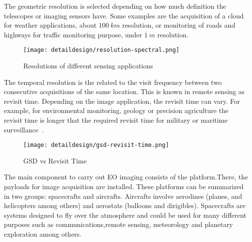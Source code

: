 

The geometric resolution is selected depending on how much definition the
telescopes or imaging sensors have. Some examples are the acquisition of a cloud
for weather applications, about $100~km$ resolution, or monitoring of roads and
highways for traffic monitoring purpose, under $1~m$ resolution.

\begin{figure}[!h]
\begin{center}
\texttt{[image: detaildesign/resolution-spectral.png]}
\caption{Resolutions of different sensing applications}
\label{fig:intr-resolution-spectral}
\end{center}
\end{figure}

The temporal resolution is the related to the visit frequency between two
consecutive acquisitions of the same location. This is known in remote sensing
as revisit time. Depending on the
image application, the revisit time can vary. For example, for environmental
monitoring, geology or precision agriculture the revisit time is longer that the
required revisit time for military or maritime surveillance~\cite{Sandau2009}.

\begin{figure}[!h]
\begin{center}
\texttt{[image: detaildesign/gsd-revisit-time.png]}
\caption{GSD vs Revisit Time}
\label{fig:intr-gsd-revisit-time}
\end{center}
\end{figure}

The main component to carry out \ac{EO} imaging consists of the platform.There, the
payloads for image acquisition are installed. These platforms can be summarized
in two groups: spacecrafts and aircrafts. Aircrafts involve aerodines (planes,
and helicopters among others) and aerostats (balloons and
dirigibles). Spacecrafts are systems designed to fly over the atmosphere and
could be used for many different purposes such as communications,remote sensing,
meteorology and planetary exploration among others.


